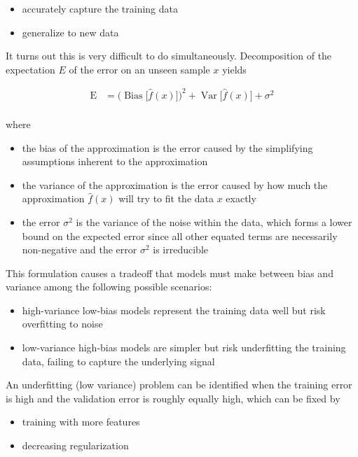 \begin{itemize}
    \item accurately capture the training data
    \item generalize to new data
\end{itemize}

It turns out this is very difficult to do simultaneously. Decomposition of the expectation $E$ of the error on an unseen sample $x$ yields

$$
{\displaystyle {\begin{aligned}\operatorname {E} &={\Big (}\operatorname {Bias} {\big [}{\hat {f}}(x){\big ]}{\Big )}^{2}+\operatorname {Var} {\big [}{\hat {f}}(x){\big ]}+\sigma ^{2}\\\end{aligned}}}
$$

where

\begin{itemize}
    \item the bias of the approximation is the error caused by the simplifying assumptions inherent to the approximation
    \item the variance of the approximation is the error caused by how much the approximation $\hat{f}(x)$ will try to fit the data $x$ exactly
    \item the error $\sigma^2$ is the variance of the noise within the data, which forms a lower bound on the expected error since all other equated terms are necessarily non-negative and the error $\sigma^2$ is irreducible
\end{itemize}

This formulation causes a tradeoff that models must make between bias and variance among the following possible scenarios:

\begin{itemize}
    \item high-variance low-bias models represent the training data well but risk overfitting to noise
    \item low-variance high-bias models are simpler but risk underfitting the training data, failing to capture the underlying signal
\end{itemize}

An underfitting (low variance) problem can be identified when the training error is high and the validation error is roughly equally high, which can be fixed by

\begin{itemize}
    \item training with more features
    \item decreasing regularization
\end{itemize}

